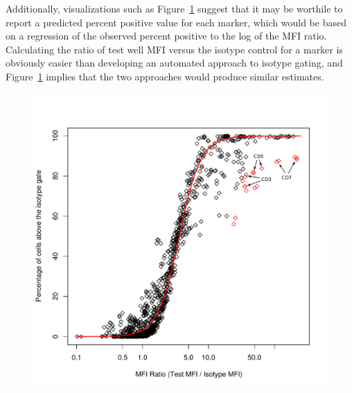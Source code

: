 \documentclass[12pt]{article}
\begin{document}
Additionally, visualizations such as Figure~\ref{fig:mfiRatio} suggest that it
may be worthile to report a predicted percent positive value for each marker,
which would be based on a regression of the observed percent positive to the
log of the MFI ratio. Calculating the ratio of test well MFI versus the isotype
control for a marker is obviously easier than developing an automated approach
to isotype gating, and Figure~\ref{fig:mfiRatio} implies that the two
approaches would produce similar estimates.

\begin{figure}
\centering
\includegraphics{mfiRatioB.pdf}
\caption{}
\label{fig:mfiRatio}
\end{figure}
\end{document}
